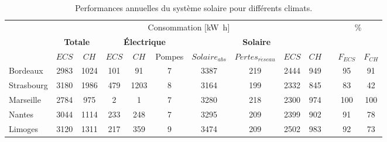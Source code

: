 \begin{table}
\small
\centering
\caption{Performances annuelles du système solaire pour différents climats.}
\label{tab:performance_annuelles}
\begin{tabular}{l c c c c c c c c c c c c}
    \toprule
               &   \multicolumn{9}{c}{Consommation [\si{\kilo\watt\hour}]} & & \multicolumn{2}{c}{\multirow{2}{*}{\%}} \\
    \cmidrule(r){2-10}
               & \multicolumn{2}{c}{\textbf{Totale}} &  \multicolumn{3}{c}{\textbf{Électrique}}  & \multicolumn{4}{c}{\textbf{Solaire}} & \\
    \cmidrule(r){2-3}
    \cmidrule(r){4-6}
    \cmidrule(r){7-10}
    \cmidrule(r){12-13}
               & $ECS$    & $CH$      &  $ECS$        & $CH$ & Pompes    & $Solaire_{abs}$  & $Pertes_{r\acute eseau}$ & $ECS$  & $CH$ & & $F_{ECS}$  & $F_{CH}$ \\
    \midrule
    Bordeaux   & \num{2983}     & \num{1024}      &  \num{101}          & \num{91}          &  \num{7}                 & \num{3387}                  & \num{219}       & \num{2444}   &  \num{949}    &   & \num{95}         & \num{91}  \\
    Strasbourg & \num{3180}     & \num{1986}      &  \num{479}          & \num{1203}        &  \num{8}                 & \num{3164}                  & \num{199}       & \num{2332}   &  \num{845}    &   & \num{83}         & \num{42}  \\
    Marseille  & \num{2784}     & \num{975}       &  \num{2}            & \num{1}           &  \num{7}                 & \num{3280}                  & \num{218}       & \num{2300}   &  \num{974}    &   & \num{100}        & \num{100} \\
    Nantes     & \num{3044}     & \num{1114}      &  \num{233}          & \num{248}         &  \num{7}                 & \num{3295}                  & \num{209}       & \num{2399}   &  \num{902}    &   & \num{91}         & \num{78}  \\
    Limoges    & \num{3120}     & \num{1311}      &  \num{217}          & \num{359}         &  \num{9}                 & \num{3474}                  & \num{209}       & \num{2502}   &  \num{983}    &   & \num{92}         & \num{73}  \\
    \bottomrule
\end{tabular}
\end{table}

